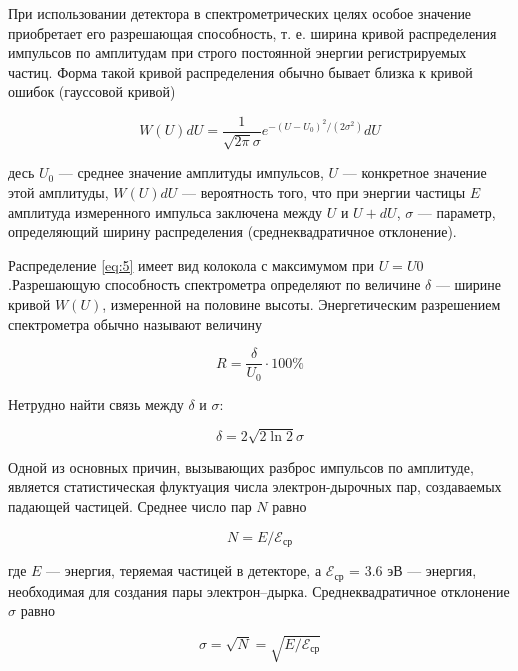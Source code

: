 \documentclass[a4paper,12pt]{article}
\begin{document}
При использовании детектора в спектрометрических целях особое значение приобретает его разрешающая способность, т. е. ширина кривой распределения импульсов по амплитудам при строго постоянной энергии регистрируемых частиц. Форма такой кривой распределения обычно бывает близка к кривой ошибок (гауссовой кривой)

\begin{equation}\label{eq:5}
    W (U) dU = \frac{1}{\sqrt{2 \pi} \sigma} e ^ { - (U - U_0)^2 / (2 \sigma^2) } dU
\end{equation}

десь $U_0$ — среднее значение амплитуды импульсов, $U$ — конкретное значение этой амплитуды, $W (U )dU$ — вероятность того, что при энергии частицы $E$ амплитуда измеренного импульса заключена между $U$ и $U + dU$, $\sigma$ — параметр, определяющий ширину распределения (среднеквадратичное отклонение).


Распределение \eqref{eq:5} имеет вид колокола с максимумом при $U = U0$.Разрешающую способность спектрометра определяют по величине $\delta$ — ширине кривой $W (U)$, измеренной на половине высоты. Энергетическим разрешением спектрометра обычно называют величину

\begin{equation}\label{eq:6}
    R = \frac{\delta}{U_0} \cdot 100 \%
\end{equation}

Нетрудно найти связь между $\delta$ и $\sigma$:


\begin{equation}\label{eq:7}
    \delta = 2 \sqrt{2 \ln 2} \sigma
\end{equation}


Одной из основных причин, вызывающих разброс импульсов по амплитуде, является статистическая флуктуация числа электрон-дырочных пар, создаваемых падающей частицей. Среднее число пар $N$ равно

\begin{equation}\label{eq:8}
    N = E / \mathcal{E}_\text{ср}
\end{equation}

где $E$ — энергия, теряемая частицей в детекторе, а $\mathcal{E}_\text{ср}$ = 3.6 эВ — энергия, необходимая для создания пары электрон–дырка. Среднеквадратичное отклонение $\sigma$ равно

\begin{equation}\label{eq:9}
    \sigma = \sqrt{N} = \sqrt{E / \mathcal{E}_\text{ср}}
\end{equation}
\end{document}
